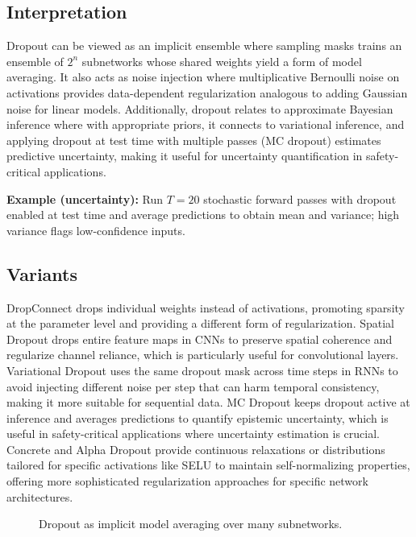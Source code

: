 \subsection{Interpretation}

Dropout can be viewed as an implicit ensemble where sampling masks trains an ensemble of $2^n$ subnetworks whose shared weights yield a form of model averaging. It also acts as noise injection where multiplicative Bernoulli noise on activations provides data-dependent regularization analogous to adding Gaussian noise for linear models. Additionally, dropout relates to approximate Bayesian inference where with appropriate priors, it connects to variational inference, and applying dropout at test time with multiple passes (MC dropout) estimates predictive uncertainty, making it useful for uncertainty quantification in safety-critical applications.

\begin{example}
\textbf{Example (uncertainty):} Run $T=20$ stochastic forward passes with dropout enabled at test time and average predictions to obtain mean and variance; high variance flags low-confidence inputs.
\end{example}

\subsection{Variants}

DropConnect drops individual weights instead of activations, promoting sparsity at the parameter level and providing a different form of regularization. Spatial Dropout drops entire feature maps in CNNs to preserve spatial coherence and regularize channel reliance, which is particularly useful for convolutional layers. Variational Dropout uses the same dropout mask across time steps in RNNs to avoid injecting different noise per step that can harm temporal consistency, making it more suitable for sequential data. MC Dropout keeps dropout active at inference and averages predictions to quantify epistemic uncertainty, which is useful in safety-critical applications where uncertainty estimation is crucial. Concrete and Alpha Dropout provide continuous relaxations or distributions tailored for specific activations like SELU to maintain self-normalizing properties, offering more sophisticated regularization approaches for specific network architectures.

\begin{figure}[htbp]
\centering
{}
\caption{Dropout as implicit model averaging over many subnetworks.}
\label{fig:dropout-ensemble}
\end{figure}

